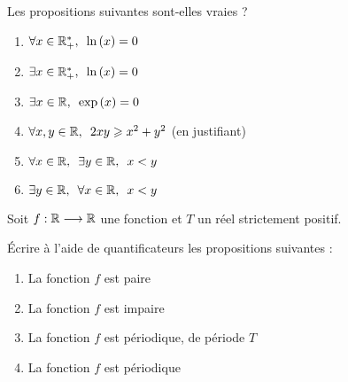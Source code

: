 \begin{exo}[Exercice 2]
Les propositions suivantes sont-elles vraies ?

\begin{enumerate}
\item \(\quantifs{\forall x\in\Rps}\ln\paren{x}=0\) \\

\item \(\quantifs{\exists x\in\Rps}\ln\paren{x}=0\) \\

\item \(\quantifs{\exists x\in\R}\exp\paren{x}=0\) \\

\item \(\quantifs{\forall x,y\in\R}2xy\geq x^2+y^2\) (en justifiant) \\

\item \(\quantifs{\forall x\in\R;\exists y\in\R}x<y\) \\

\item \(\quantifs{\exists y\in\R;\forall x\in\R}x<y\)
\end{enumerate}
\end{exo}

\begin{corr}
\end{corr}

\begin{exo}[Exercice 3]
Soit \(f:\mathbb{R}\longrightarrow\mathbb{R}\) une fonction et \(T\) un réel strictement positif.

Écrire à l'aide de quantificateurs les propositions suivantes :

\begin{enumerate}
\item La fonction \(f\) est paire \\

\item La fonction \(f\) est impaire \\

\item La fonction \(f\) est périodique, de période \(T\) \\

\item La fonction \(f\) est périodique
\end{enumerate}
\end{exo}

\begin{corr}
\end{corr}

